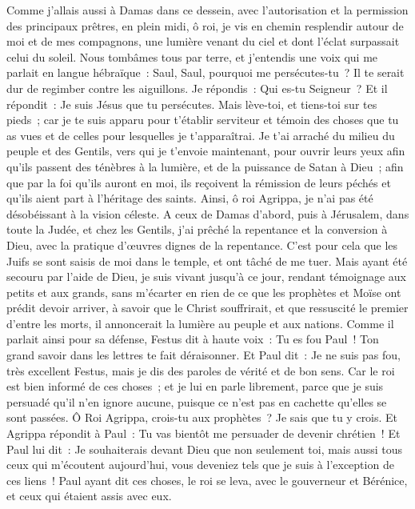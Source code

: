 \begin{multicols}{2}
Comme j'allais aussi à Damas dans ce dessein, avec l'autorisation et la permission des principaux prêtres,
en plein midi, ô roi, je vis en chemin resplendir autour de moi et de mes compagnons, une lumière venant du ciel et dont l'éclat surpassait celui du soleil.
Nous tombâmes tous par terre, et j'entendis une voix qui me parlait en langue hébraïque~: Saul, Saul, pourquoi me persécutes-tu~? Il te serait dur de regimber contre les aiguillons.
Je répondis~: Qui es-tu Seigneur~? Et il répondit~: Je suis Jésus que tu persécutes.
Mais lève-toi, et tiens-toi sur tes pieds~; car je te suis apparu pour t'établir serviteur et témoin des choses que tu as vues et de celles pour lesquelles je t'apparaîtrai.
Je t'ai arraché du milieu du peuple et des Gentils, vers qui je t'envoie maintenant,
pour ouvrir leurs yeux afin qu'ils passent des ténèbres à la lumière, et de la puissance de Satan à Dieu~; afin que par la foi qu'ils auront en moi, ils reçoivent la rémission de leurs péchés et qu'ils aient part à l'héritage des saints.
Ainsi, ô roi Agrippa, je n'ai pas été désobéissant à la vision céleste.
A ceux de Damas d'abord, puis à Jérusalem, dans toute la Judée, et chez les Gentils, j'ai prêché la repentance et la conversion à Dieu, avec la pratique d'œuvres dignes de la repentance.
C'est pour cela que les Juifs se sont saisis de moi dans le temple, et ont tâché de me tuer.
Mais ayant été secouru par l'aide de Dieu, je suis vivant jusqu'à ce jour, rendant témoignage aux petits et aux grands, sans m'écarter en rien de ce que les prophètes et Moïse ont prédit devoir arriver,
à savoir que le Christ souffrirait, et que ressuscité le premier d'entre les morts, il annoncerait la lumière au peuple et aux nations.
Comme il parlait ainsi pour sa défense, Festus dit à haute voix~: Tu es fou Paul~! Ton grand savoir dans les lettres te fait déraisonner.
Et Paul dit~: Je ne suis pas fou, très excellent Festus, mais je dis des paroles de vérité et de bon sens.
Car le roi est bien informé de ces choses~; et je lui en parle librement, parce que je suis persuadé qu'il n'en ignore aucune, puisque ce n'est pas en cachette qu'elles se sont passées.
Ô Roi Agrippa, crois-tu aux prophètes~? Je sais que tu y crois.
Et Agrippa répondit à Paul~: Tu vas bientôt me persuader de devenir chrétien~!
Et Paul lui dit~: Je souhaiterais devant Dieu que non seulement toi, mais aussi tous ceux qui m'écoutent aujourd'hui, vous deveniez tels que je suis à l'exception de ces liens~!
Paul ayant dit ces choses, le roi se leva, avec le gouverneur et Bérénice, et ceux qui étaient assis avec eux.

\end{multicols}
